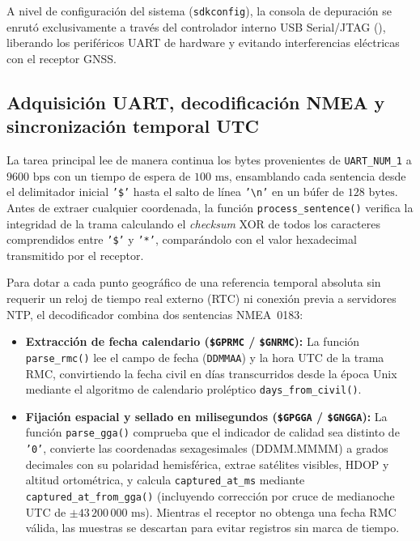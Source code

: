 \documentclass[12pt, letterpaper]{article}
\begin{document}
A nivel de configuración del sistema (\texttt{sdkconfig}), la consola de depuración se enrutó exclusivamente a través del controlador interno USB Serial/JTAG (), liberando los periféricos UART de hardware y evitando interferencias eléctricas con el receptor GNSS.

\subsection*{Adquisición UART, decodificación NMEA y sincronización temporal UTC}

La tarea principal lee de manera continua los bytes provenientes de \texttt{UART\_NUM\_1} a $9600\text{ bps}$ con un tiempo de espera de $100\text{ ms}$, ensamblando cada sentencia desde el delimitador inicial \texttt{'\$'} hasta el salto de línea \texttt{'\textbackslash n'} en un búfer de $128\text{ bytes}$. Antes de extraer cualquier coordenada, la función \texttt{process\_sentence()} verifica la integridad de la trama calculando el \textit{checksum} XOR de todos los caracteres comprendidos entre \texttt{'\$'} y \texttt{'*'}, comparándolo con el valor hexadecimal transmitido por el receptor.

Para dotar a cada punto geográfico de una referencia temporal absoluta sin requerir un reloj de tiempo real externo (RTC) ni conexión previa a servidores NTP, el decodificador combina dos sentencias NMEA~0183:

\begin{itemize}
    \item \textbf{Extracción de fecha calendario (\texttt{\$GPRMC} / \texttt{\$GNRMC}):} La función \texttt{parse\_rmc()} lee el campo de fecha (\texttt{DDMMAA}) y la hora UTC de la trama RMC, convirtiendo la fecha civil en días transcurridos desde la época Unix mediante el algoritmo de calendario proléptico \texttt{days\_from\_civil()}.
    \item \textbf{Fijación espacial y sellado en milisegundos (\texttt{\$GPGGA} / \texttt{\$GNGGA}):} La función \texttt{parse\_gga()} comprueba que el indicador de calidad sea distinto de \texttt{'0'}, convierte las coordenadas sexagesimales ($\text{DDMM.MMMM}$) a grados decimales con su polaridad hemisférica, extrae satélites visibles, HDOP y altitud ortométrica, y calcula \texttt{captured\_at\_ms} mediante \texttt{captured\_at\_from\_gga()} (incluyendo corrección por cruce de medianoche UTC de $\pm 43\,200\,000\text{ ms}$). Mientras el receptor no obtenga una fecha RMC válida, las muestras se descartan para evitar registros sin marca de tiempo.
\end{itemize}
\end{document}
